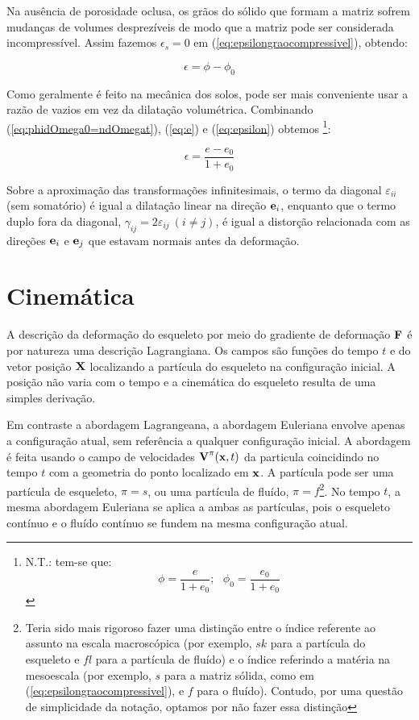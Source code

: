 \documentclass[
	11pt, %
	fleqn, %
	a4paper, %
]{LegrandOrangeBook}
\begin{document}
Na ausência de porosidade oclusa, os grãos do sólido que formam a matriz sofrem mudanças de volumes desprezíveis de modo que a matriz pode ser considerada incompressível. Assim fazemos $\epsilon_s = 0$ em (\ref{eq:epsilongraocompressivel}), obtendo:

\begin{equation}
	\label{eq:epsilon}	
	\epsilon = \phi - \phi_0
\end{equation}

Como geralmente é feito na mecânica dos solos, pode ser mais conveniente usar a razão de vazios em vez da dilatação volumétrica. Combinando (\ref{eq:phidOmega0=ndOmegat}), (\ref{eq:e}) e (\ref{eq:epsilon}) obtemos \footnote{N.T.: tem-se que:
	\begin{displaymath}	
		\phi = \dfrac{e}{1+e_0}; ~~~ \phi_0 = \dfrac{e_0}{1+e_0}
	\end{displaymath}
}:

\begin{equation}
	\label{eq:epsilon}	
	\epsilon = \dfrac{e-e_0}{1+e_0}
\end{equation}

Sobre a aproximação das transformações infinitesimais, o termo da diagonal $\varepsilon_{ii}$ (sem somatório) é igual a dilatação linear na direção $\textbf{e}_i$, enquanto que o termo duplo fora da diagonal, $\gamma_{ij}=2\varepsilon_{ij}~(i\neq j)$, é igual a distorção relacionada com as direções $\textbf{e}_i$ e $\textbf{e}_j$ que estavam normais antes da deformação.


\section{Cinemática}

A descrição da deformação do esqueleto por meio do gradiente de deformação $\textbf{F}$ é por natureza uma descrição Lagrangiana. Os campos são funções do tempo $t$ e do vetor posição $\textbf{X}$ localizando a partícula do esqueleto na configuração inicial. A posição não varia com o tempo e a cinemática do esqueleto resulta de uma simples derivação.

Em contraste a abordagem Lagrangeana, a abordagem Euleriana envolve apenas a configuração atual, sem referência a qualquer configuração inicial. A abordagem é feita usando o campo de velocidades $\textbf{V}^\pi(\textbf{x},t)$ da particula coincidindo no tempo $t$ com a geometria do ponto localizado em $\textbf{x}$. A partícula pode ser uma partícula de esqueleto, $\pi = s$, ou uma partícula de fluído, $\pi = f$\footnote{Teria sido mais rigoroso fazer uma distinção entre o índice referente ao assunto na escala macroscópica (por exemplo, $sk$ para a partícula do esqueleto e $fl$ para a partícula de fluído) e o índice referindo a matéria na mesoescala (por exemplo, $s$ para a matriz sólida, como em (\ref{eq:epsilongraocompressivel}), e $f$ para o fluído). Contudo, por uma questão de simplicidade da notação, optamos por não fazer essa distinção}. No tempo $t$, a mesma abordagem Euleriana se aplica a ambas as partículas, pois o esqueleto contínuo e o fluído contínuo se fundem na mesma configuração atual.
\end{document}
